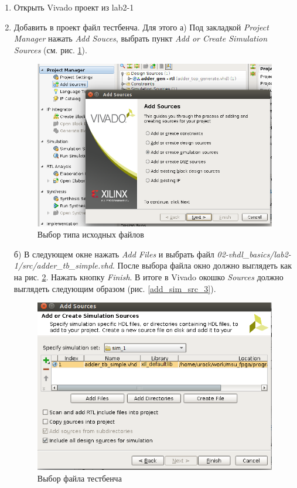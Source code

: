 \begin{enumerate}
\item Открыть Vivado проект из lab2-1
\item Добавить в проект файл тестбенча. Для этого
а) Под закладкой \emph{Project Manager} нажать \emph{Add Souces}, выбрать пункт \emph{Add or Create Simulation Sources} (см. рис. \ref{add_sim_src_1}).

\begin{figure}
\centering
\includegraphics[width=1.2\textwidth]{03-vhdl_modeling/fig/add_sim_src_1.png}
\caption{Выбор типа исходных файлов}
\label{add_sim_src_1}
\end{figure}

б) В следующем окне нажать \emph{Add Files} и выбрать файл \emph{02-vhdl\_basics/lab2-1/src/adder\_tb\_simple.vhd}. После выбора файла окно должно выглядеть как на рис. \ref{add_sim_src_2}. Нажать кнопку \emph{Finish}. В итоге в Vivado окошко \emph{Sources} должно выглядеть следующим образом (рис. \ref{add_sim_src_3}).

\begin{figure}
\centering
\includegraphics[width=1.2\textwidth]{03-vhdl_modeling/fig/add_sim_src_2.png}
\caption{Выбор файла тестбенча}
\label{add_sim_src_2}
\end{figure}


\end{enumerate}
